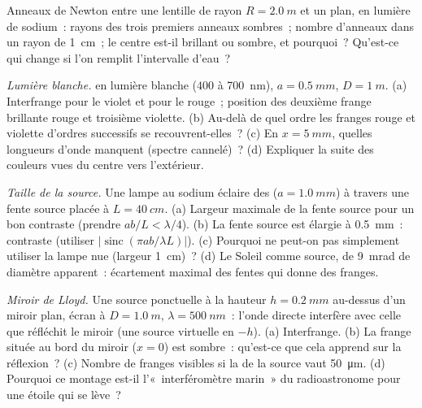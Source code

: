 \begin{exercise}[$\star$]\label{exo:b2:two-wave-interference:4}
Anneaux de Newton entre une lentille de rayon $R = \qty{2.0}{m}$ et un plan, en
lumière de sodium~: rayons des trois premiers anneaux sombres~; nombre d'anneaux
dans un rayon de \qty{1}{cm}~; le centre est-il brillant ou sombre, et pourquoi~?
Qu'est-ce qui change si l'on remplit l'intervalle d'eau~?
\end{exercise}

\begin{exercise}[$\star\star$]\label{exo:b2:two-wave-interference:5}
\emph{Lumière blanche.}  en lumière blanche ($400$ à \qty{700}{nm}),
$a = \qty{0.5}{mm}$, $D = \qty{1}{m}$. (a) Interfrange pour le violet et pour le rouge~;
position des deuxième frange brillante rouge et troisième violette. (b)
Au-delà de quel ordre les franges rouge et violette d'ordres successifs se recouvrent-elles~? (c)
En $x = \qty{5}{mm}$, quelles longueurs d'onde manquent
(spectre cannelé)~? (d) Expliquer la suite des couleurs vues du
centre vers l'extérieur.
\end{exercise}

\begin{exercise}[$\star\star$]\label{exo:b2:two-wave-interference:6}
\emph{Taille de la source.} Une lampe au sodium éclaire des  ($a = \qty{1.0}{mm}$)
à travers une fente source placée à $L = \qty{40}{cm}$. (a) Largeur maximale de la
fente source pour un bon contraste (prendre $ab/L < \lambda/4$). (b) La fente source
est élargie à \qty{0.5}{mm}~: contraste (utiliser $|\operatorname{sinc}(\pi ab/\lambda L)|$).
(c) Pourquoi ne peut-on pas simplement utiliser la lampe nue (largeur \qty{1}{cm})~? (d) Le
Soleil comme source, de \qty{9}{mrad} de diamètre apparent~: écartement maximal des fentes qui
donne des franges.
\end{exercise}

\begin{exercise}[$\star\star$]\label{exo:b2:two-wave-interference:7}
\emph{Miroir de Lloyd.} Une source ponctuelle à la hauteur $h = \qty{0.2}{mm}$ au-dessus d'un
miroir plan, écran à $D = \qty{1.0}{m}$, $\lambda = \qty{500}{nm}$~: l'onde directe
interfère avec celle que réfléchit le miroir (une source virtuelle en
$-h$). (a) Interfrange. (b) La frange située au bord du miroir ($x = 0$) est
sombre~: qu'est-ce que cela apprend sur la réflexion~? (c) Nombre de franges
visibles si la  de la source vaut \qty{50}{\micro m}. (d) Pourquoi ce
montage est-il l'«~interféromètre marin~» du radioastronome pour une étoile qui se lève~?
\end{exercise}

